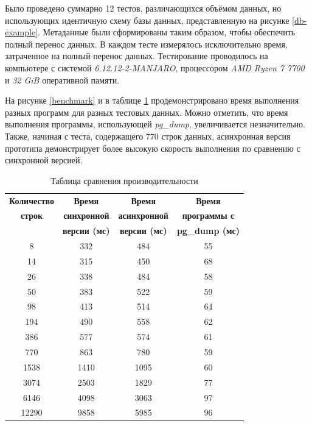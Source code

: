 Было проведено суммарно 12 тестов, различающихся объёмом данных, но использующих идентичную схему базы данных, представленную на рисунке \ref{db-example}. Метаданные были сформированы таким образом, чтобы обеспечить полный перенос данных. В каждом тесте измерялось исключительно время, затраченное на полный перенос данных. Тестирование проводилось на компьютере с системой \textit{6.12.12-2-MANJARO}, процессором \textit{AMD Ryzen 7 7700} и \textit{32 GiB} оперативной памяти.

На рисунке \ref{benchmark} и в таблице \ref{tab:benchmark} продемонстрировано время выполнения разных программ для разных тестовых данных. Можно отметить, что время выполнения программы, использующей \textit{pg\_dump}, увеличивается незначительно. Также, начиная с теста, содержащего 770 строк данных, асинхронная версия прототипа демонстрирует более высокую скорость выполнения по сравнению с синхронной версией.

\begin{table}[h!]
    \caption{Таблица сравнения производительности}
    \begin{tabular}{|c|c|c|c|}
        \hline
        \textbf{Количество} & \textbf{Время} & \textbf{Время} & \textbf{Время} \\
        \textbf{строк} & \textbf{синхронной} & \textbf{асинхронной} & \textbf{программы с} \\
         & \textbf{версии (мс)} & \textbf{версии (мс)} & \textbf{pg\_dump (мс)} \\
        \hline
        8 & 332 & 484 & 55 \\
        \hline
        14 & 315 & 450 & 68 \\
        \hline
        26 & 338 & 484 & 58 \\
        \hline
        50 & 383 & 522 & 59 \\
        \hline
        98 & 413 & 514 & 64 \\
        \hline
        194 & 490 & 558 & 62 \\
        \hline
        386 & 577 & 574 & 61 \\
        \hline
        770 & 863 & 780 & 59 \\
        \hline
        1538 & 1410 & 1095 & 60 \\
        \hline
        3074 & 2503 & 1829 & 77 \\
        \hline
        6146 & 4098 & 3063 & 97 \\
        \hline
        12290 & 9858 & 5985 & 96 \\
        \hline
    \end{tabular}
    \label{tab:benchmark}
\end{table}

